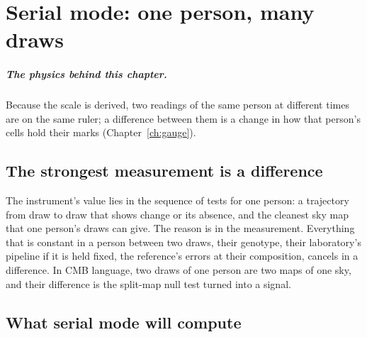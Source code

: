 \chapter{Serial mode: one person, many draws}\label{ch:serial}

\paragraph{The physics behind this chapter.} Because the scale is derived, two readings of the same person at different times are on the same ruler; a difference between them is a change in how that person's cells hold their marks (Chapter~\ref{ch:gauge}).

\section{The strongest measurement is a difference}

The instrument's value lies in the sequence of tests for one person: a trajectory from draw to draw that shows change or its absence,
and the cleanest sky map that one person's draws can give. The reason is in the measurement. Everything that is constant in a person between two draws, their genotype, their laboratory's pipeline if it is
held fixed, the reference's errors at their composition, cancels in a difference. In CMB language, two draws of one person are two maps of one sky,
and their difference is the split-map null test turned into a signal.

\section{What serial mode will compute}

